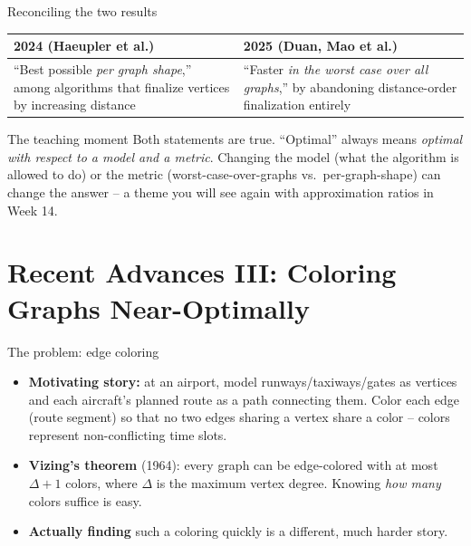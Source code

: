 \documentclass[11pt,aspectratio=169]{beamer}
\begin{document}
\begin{frame}{Reconciling the two results}
  \begin{center}
  \begin{tabular}{@{}p{4.6cm}p{4.6cm}@{}}
    \toprule
    \textbf{2024 (Haeupler et al.)} & \textbf{2025 (Duan, Mao et al.)} \\
    \midrule
    ``Best possible \emph{per graph shape},'' among algorithms that finalize vertices
    by increasing distance & ``Faster \emph{in the worst case over all graphs},''
    by abandoning distance-order finalization entirely \\
    \bottomrule
  \end{tabular}
  \end{center}
  \vspace{0.5em}
  \begin{alertblock}{The teaching moment}
    Both statements are true. ``Optimal'' always means \emph{optimal with respect to a
    model and a metric}. Changing the model (what the algorithm is allowed to do) or the
    metric (worst-case-over-graphs vs.\ per-graph-shape) can change the answer --
    a theme you will see again with approximation ratios in Week 14.
  \end{alertblock}
\end{frame}

\section{Recent Advances III: Coloring Graphs Near-Optimally}

\begin{frame}{The problem: edge coloring}
  \begin{itemize}
    \item \textbf{Motivating story:} at an airport, model runways/taxiways/gates as
    vertices and each aircraft's planned route as a path connecting them. Color each
    edge (route segment) so that no two edges sharing a vertex share a color -- colors
    represent non-conflicting time slots.
    \item \textbf{Vizing's theorem} (1964): every graph can be edge-colored with at most
    $\Delta + 1$ colors, where $\Delta$ is the maximum vertex degree. Knowing \emph{how
    many} colors suffice is easy.
    \item \textbf{Actually finding} such a coloring quickly is a different, much harder
    story.
  \end{itemize}
\end{frame}
\end{document}
